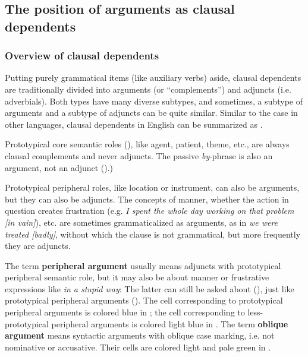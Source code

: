 \documentclass[UTF8, a4paper, oneside, scheme=plain]{ctexrep}
\newcommand*{\concept}[1]{\textbf{#1}}
\newcommand{\corpus}[1]{\emph{#1}}
\begin{document}
\subsection{The position of arguments as clausal dependents}\label{sec:valency.overview.dependents}

\subsubsection{Overview of clausal dependents}\label{sec:valency.overview.dependents.classes}

Putting purely grammatical items (like auxiliary verbs) aside,
clausal dependents are traditionally divided into arguments (or ``complements'') and adjuncts (i.e. adverbials).
Both types have many diverse subtypes,
and sometimes, 
a subtype of arguments and a subtype of adjuncts can be quite similar.
Similar to the case in other languages, 
clausal dependents in English can be summarized as .

Prototypical core semantic roles (), 
like agent, patient, theme, etc.,
are always clausal complements and never adjuncts.
The passive \corpus{by}-phrase is also an argument, not an adjunct 
().)

Prototypical peripheral roles, like location or instrument, can also be arguments,
but they can also be adjuncts.
The concepts of manner, whether the action in question creates frustration 
(e.g. \corpus{I spent the whole day working on that problem [in vain]}), etc.
are sometimes grammaticalized as arguments,
as in \corpus{we were treated [badly]},
without which the clause is not grammatical,
but more frequently they are adjuncts.

The term \concept{peripheral argument}
usually means adjuncts with prototypical peripheral semantic role,
but it may also be about manner or frustrative expressions like \corpus{in a stupid way}:
The latter can still be asked about (), 
just like prototypical peripheral arguments (). 
The cell corresponding to prototypical peripheral arguments
is colored blue in ;
the cell corresponding to less-prototypical peripheral arguments
is colored light blue in .
The term \concept{oblique argument} 
means syntactic arguments with oblique case marking, i.e. not nominative or accusative.
Their cells are colored light and pale green in .
\end{document}
